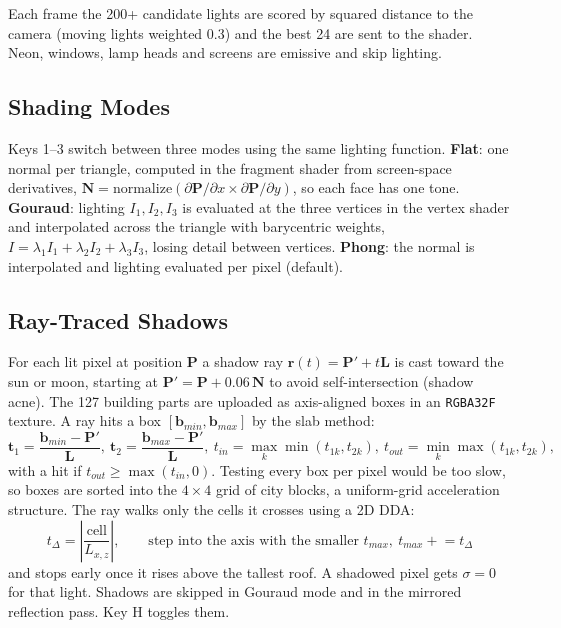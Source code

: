 \documentclass[12pt, a4paper]{report}
\begin{document}
\begin{justify}
  {\fontsize{12}{13.8}\selectfont
    Each frame the 200+ candidate lights are scored by squared distance to the camera (moving lights weighted 0.3) and the best 24 are sent to the shader. Neon, windows, lamp heads and screens are emissive and skip lighting.
  }
\end{justify}

\subsection{Shading Modes}

\begin{justify}
  {\fontsize{12}{13.8}\selectfont
    Keys 1--3 switch between three modes using the same lighting function. \textbf{Flat}: one normal per triangle, computed in the fragment shader from screen-space derivatives, $\mathbf{N} = \mathrm{normalize}(\partial\mathbf{P}/\partial x \times \partial\mathbf{P}/\partial y)$, so each face has one tone. \textbf{Gouraud}: lighting $I_1,I_2,I_3$ is evaluated at the three vertices in the vertex shader and interpolated across the triangle with barycentric weights, $I=\lambda_1 I_1+\lambda_2 I_2+\lambda_3 I_3$, losing detail between vertices. \textbf{Phong}: the normal is interpolated and lighting evaluated per pixel (default).
  }
\end{justify}

\subsection{Ray-Traced Shadows}

\begin{justify}
  {\fontsize{12}{13.8}\selectfont
    For each lit pixel at position $\mathbf{P}$ a shadow ray $\mathbf{r}(t)=\mathbf{P}'+t\mathbf{L}$ is cast toward the sun or moon, starting at $\mathbf{P}'=\mathbf{P}+0.06\,\mathbf{N}$ to avoid self-intersection (shadow acne). The 127 building parts are uploaded as axis-aligned boxes in an \texttt{RGBA32F} texture. A ray hits a box $[\mathbf{b}_{min},\mathbf{b}_{max}]$ by the slab method:
    \begin{equation}
      \mathbf{t}_1=\frac{\mathbf{b}_{min}-\mathbf{P}'}{\mathbf{L}},\ \mathbf{t}_2=\frac{\mathbf{b}_{max}-\mathbf{P}'}{\mathbf{L}},\
      t_{in}=\max_k\min(t_{1k},t_{2k}),\ t_{out}=\min_k\max(t_{1k},t_{2k}),
    \end{equation}
    with a hit if $t_{out}\ge\max(t_{in},0)$. Testing every box per pixel would be too slow, so boxes are sorted into the $4\times4$ grid of city blocks, a uniform-grid acceleration structure. The ray walks only the cells it crosses using a 2D DDA:
    \begin{equation}
      t_{\Delta}=\left|\frac{\text{cell}}{L_{x,z}}\right|,\qquad \text{step into the axis with the smaller } t_{max},\ t_{max}\mathrel{+}=t_{\Delta}
    \end{equation}
    and stops early once it rises above the tallest roof. A shadowed pixel gets $\sigma=0$ for that light. Shadows are skipped in Gouraud mode and in the mirrored reflection pass. Key H toggles them.
  }
\end{justify}
\end{document}
